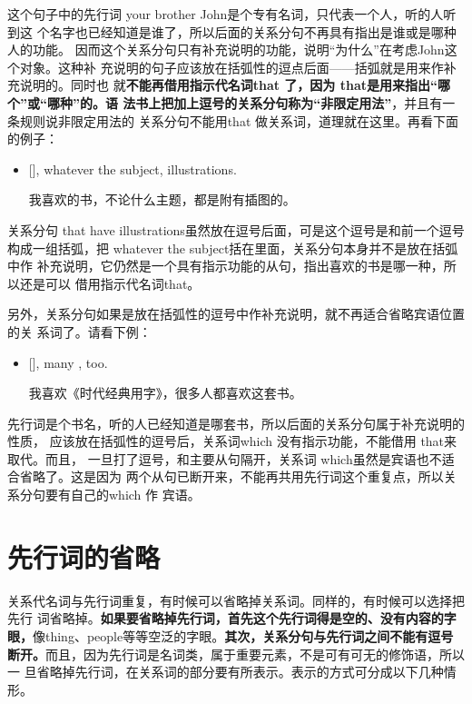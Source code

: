 这个句子中的先行词 your brother John是个专有名词，只代表一个人，听的人听到这
个名字也已经知道是谁了，所以后面的关系分句不再具有指出是谁或是哪种人的功能。
因而这个关系分句只有补充说明的功能，说明“为什么”在考虑John这个对象。这种补
充说明的句子应该放在括弧性的逗点后面——括弧就是用来作补充说明的。同时也
就\textbf{不能再借用指示代名词that 了，因为 that是用来指出“哪个”或“哪种”的。语
  法书上把加上逗号的关系分句称为“非限定用法”}，并且有一条规则说非限定用法的
关系分句不能用that 做关系词，道理就在这里。再看下面的例子：
\begin{itemize}
\item {}  [], whatever the
  subject,   illustrations.

  我喜欢的书，不论什么主题，都是附有插图的。
\end{itemize}

关系分句 that have illustrations虽然放在逗号后面，可是这个逗号是和前一个逗号
构成一组括弧，把 whatever the subject括在里面，关系分句本身并不是放在括弧中作
补充说明，它仍然是一个具有指示功能的从句，指出喜欢的书是哪一种，所以还是可以
借用指示代名词that。

另外，关系分句如果是放在括弧性的逗号中作补充说明，就不再适合省略宾语位置的关
系词了。请看下例：
\begin{itemize}
\item {}  [],
   many  , too.

  我喜欢《时代经典用字》，很多人都喜欢这套书。
\end{itemize}

先行词是个书名，听的人已经知道是哪套书，所以后面的关系分句属于补充说明的性质，
应该放在括弧性的逗号后，关系词which 没有指示功能，不能借用 that来取代。而且，
一旦打了逗号，和主要从句隔开，关系词 which虽然是宾语也不适合省略了。这是因为
两个从句已断开来，不能再共用先行词这个重复点，所以关系分句要有自己的which 作
宾语。

\section{先行词的省略}

关系代名词与先行词重复，有时候可以省略掉关系词。同样的，有时候可以选择把先行
词省略掉。\textbf{如果要省略掉先行词，首先这个先行词得是空的、没有内容的字
  眼，}像thing、people等等空泛的字眼。\textbf{其次，关系分句与先行词之间不能有逗号
  断开。}而且，因为先行词是名词类，属于重要元素，不是可有可无的修饰语，所以一
旦省略掉先行词，在关系词的部分要有所表示。表示的方式可分成以下几种情形。

